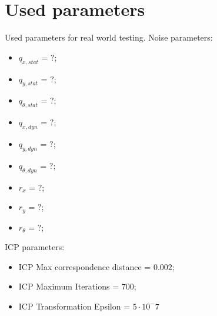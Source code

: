 \appendices
\label{sec:Appendices}
\section{Used parameters}
\label{sec:parameters}
Used parameters for real world testing.
Noise parameters:
\begin{itemize}
\item $q_{x,stat}$ = $?$;
\item $q_{y,stat}$ = $?$;
\item $q_{\theta,stat}$ = $?$;
\item $q_{x,dyn}$ = $?$;
\item $q_{y,dyn}$ = $?$;
\item $q_{\theta,dyn}$ = $?$;
\item $r_{x}$ = $?$;
\item $r_{y}$ = $?$;
\item $r_{\theta}$ = $?$;
\end{itemize}
ICP parameters:
\begin{itemize}
\item ICP Max correspondence distance = $0.002$;
\item ICP Maximum Iterations = $700$;
\item ICP Transformation Epsilon = $5 \cdot 10^-7$
\end{itemize}

